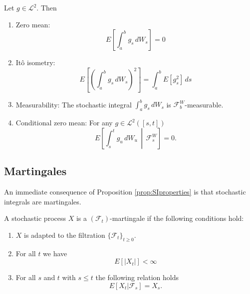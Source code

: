 \begin{proposition}
    Let $g\in\mathcal{L}^2$. Then
    \begin{enumerate}[label=(\alph*)]
        \item Zero mean:
        \begin{equation}
            E\left[\int_a^b g_s\, dW_s \right] = 0
        \end{equation}
        \item Itô isometry:
        \begin{equation}
            E\left[\left(\int_a^b g_s\, dW_s\right)^2\right] = \int_a^b E[g_s^2]\, ds
        \end{equation}
        \item Measurability: The stochastic integral $\int_a^b g_s\, dW_s$ is $\mathcal{F}_b^W$-measurable.
        \item Conditional zero mean: For any $g\in\mathcal{L}^2([s,t])$
        \begin{equation}
            E\left[\int_s^t g_u\, dW_u \,\middle|\, \mathcal{F}_s^W\right] = 0.
        \end{equation}
    \end{enumerate}
    \label{prop:SIproperties}
\end{proposition}







\subsection{Martingales}

An immediate consequence of Proposition \ref{prop:SIproperties} is that stochastic integrals are martingales.

\begin{definition}[Martingale]
    A stochastic process $X$ is a $(\mathcal{F}_t)$-martingale if the following conditions hold:
    \begin{enumerate}
        \item $X$ is adapted to the filtration $\{\mathcal{F}_t\}_{t\geq0}$.
        \item For all $t$ we have 
        $$E[|X_t|]<\infty$$
        \item For all $s$ and $t$ with $s\leq t$ the following relation holds
        $$E[X_t|\mathcal{F}_s]=X_s.$$
    \end{enumerate}
    \label{def:martingale}
\end{definition}


